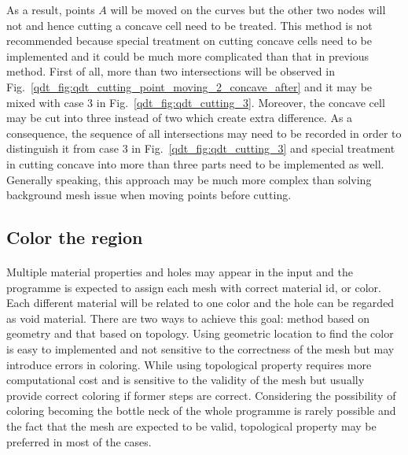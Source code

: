 As a result, points $A$ will be moved on the curves but the other two nodes will not and hence cutting a concave cell need to be treated.
This method is not recommended because special treatment on cutting concave cells need to be implemented and it could be much more complicated than that in previous method.
First of all, more than two intersections will be observed in Fig.~\ref{qdt_fig:qdt_cutting_point_moving_2_concave_after} and it may be mixed with case 3 in Fig.~\ref{qdt_fig:qdt_cutting_3}.
Moreover, the concave cell may be cut into three instead of two which create extra difference.
As a consequence, the sequence of all intersections may need to be recorded in order to distinguish it from case 3 in Fig.~\ref{qdt_fig:qdt_cutting_3} and special treatment in cutting concave into more than three parts need to be implemented as well.
Generally speaking, this approach may be much more complex than solving background mesh issue when moving points before cutting.


% 
\subsection{Color the region}
\paragraph{}
Multiple material properties and holes may appear in the input and the programme is expected to assign each mesh with correct material id, or color.
Each different material will be related to one color and the hole can be regarded as void material.
There are two ways to achieve this goal: method based on geometry and that based on topology.
Using geometric location to find the color is easy to implemented and not sensitive to the correctness of the mesh but may introduce errors in coloring.
While using topological property requires more computational cost and is sensitive to the validity of the mesh but usually provide correct coloring if former steps are correct.
Considering the possibility of coloring becoming the bottle neck of the whole programme is rarely possible and the fact that the mesh are expected to be valid, topological property may be preferred in most of the cases.

